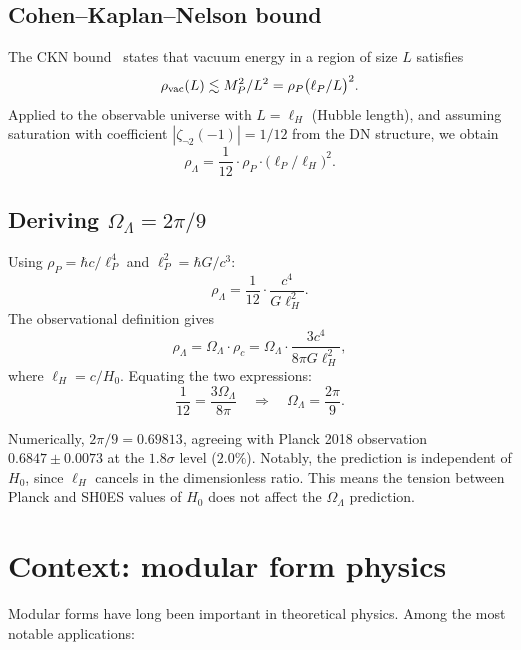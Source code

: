 \documentclass[11pt,a4paper]{article}
\begin{document}
\subsection{Cohen--Kaplan--Nelson bound}

The CKN bound~\cite{CKN1999} states that vacuum energy in a region of
size $L$ satisfies
\begin{equation}
\rho_{\rm vac}(L) \lesssim M_P^2/L^2 = \rho_P\bigl(\ell_P/L\bigr)^2.
\end{equation}
Applied to the observable universe with $L = \ell_H$ (Hubble length),
and assuming saturation with coefficient $|\zeta_{\neg 2}(-1)| = 1/12$
from the DN structure, we obtain
\begin{equation}
\rho_\Lambda = \frac{1}{12}\cdot\rho_P\cdot\bigl(\ell_P/\ell_H\bigr)^2.
\end{equation}

\subsection{Deriving $\Omega_\Lambda = 2\pi/9$}

Using $\rho_P = \hbar c/\ell_P^4$ and $\ell_P^2 = \hbar G/c^3$:
\begin{equation}
\rho_\Lambda = \frac{1}{12}\cdot\frac{c^4}{G\ell_H^2}.
\end{equation}
The observational definition gives
\begin{equation}
\rho_\Lambda = \Omega_\Lambda\cdot\rho_c = \Omega_\Lambda\cdot\frac{3c^4}{8\pi G\ell_H^2},
\end{equation}
where $\ell_H = c/H_0$. Equating the two expressions:
\begin{equation}
\frac{1}{12} = \frac{3\Omega_\Lambda}{8\pi}
\quad\Longrightarrow\quad
\boxed{\Omega_\Lambda = \frac{2\pi}{9}}.
\end{equation}

Numerically, $2\pi/9 = 0.69813$, agreeing with Planck 2018
observation $0.6847 \pm 0.0073$ at the $1.8\sigma$ level
($2.0\%$). Notably, the prediction is independent of $H_0$, since
$\ell_H$ cancels in the dimensionless ratio. This means the
tension between Planck and SH0ES values of $H_0$ does not affect
the $\Omega_\Lambda$ prediction.

\section{Context: modular form physics}
\label{sec:context}

Modular forms have long been important in theoretical physics. Among
the most notable applications:
\end{document}
